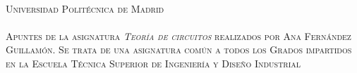 \documentclass[11pt]{book} %
\begin{document}
	
	
	\newpage
	~\vfill
	\thispagestyle{empty}
	
	\noindent \textsc{Universidad Politécnica de Madrid}\\
	
	\noindent \href{}\\ %
	
	\noindent \textsc{Apuntes de la asignatura \emph{Teoría de circuitos} realizados por Ana Fernández Guillamón. Se trata de una asignatura común a todos los Grados impartidos en la Escuela Técnica Superior de Ingeniería y Diseño Industrial}\\ %
	
	
	
	
	\pagestyle{empty} %
	
	\tableofcontents %
	
	
	\pagestyle{fancy} %
	
	
\end{document}

